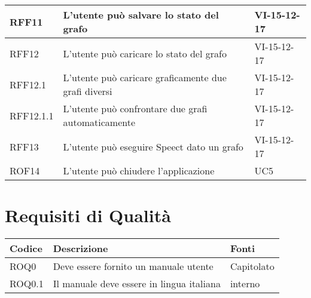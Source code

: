 \documentclass[../AnalisideiRequisiti.tex]{subfiles}
\begin{document}
\begin{longtable}{| p{3cm} | p{6cm} | p{3cm} |}
		
		\newline RFF11&
		\newline L'utente può salvare lo stato del grafo&
		\newline VI-15-12-17 
		\\[1em]
		\hline
		
		
		\newline RFF12&
		\newline L'utente può caricare lo stato del grafo&
		\newline VI-15-12-17
		\\[1em]
		\hline
		
			\newline RFF12.1&
		\newline L'utente può caricare  graficamente due grafi diversi&
		\newline VI-15-12-17
		\\[1em]
		\hline
		
			\newline RFF12.1.1&
		\newline L'utente può confrontare due grafi automaticamente&
		\newline VI-15-12-17
		\\[1em]
		\hline
		
		
		\newline RFF13&
		\newline L'utente può eseguire Speect dato un grafo&
		\newline VI-15-12-17
		\\[1em]
		\hline
		
	
		
		\newline ROF14&
		\newline L'utente può chiudere l'applicazione&
		\newline UC5
		\\[1em]
		\hline
		
		
	\end{longtable}
	\section{Requisiti di Qualità}
		\begin{longtable}{| p{3cm} | p{6cm} | p{3cm} |}
			\hline
			\textbf{Codice} & \textbf{Descrizione} & \textbf{Fonti}\\
			\hline
			\endhead
				
			
			\newline ROQ0&
		\newline Deve essere fornito un manuale utente&
		\newline Capitolato
		\\[1em]
		\hline
			\newline ROQ0.1&
			\newline Il manuale deve essere in lingua italiana&
			\newline interno
			\\[1em]
			\hline
	\end{longtable}
\end{document}
